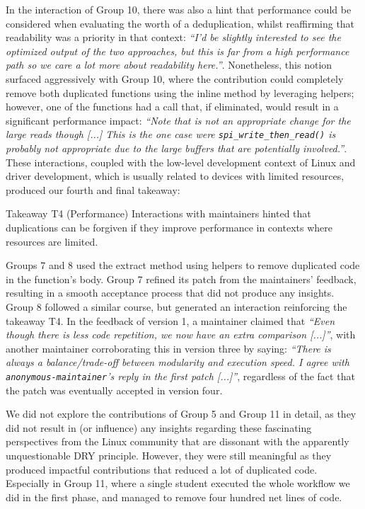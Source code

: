 \documentclass[10pt,conference]{IEEEtran}
\newenvironment{highlight-box}[1]{%
  \begin{tcolorbox}[colback=gray!10, colframe=gray!50!black, boxrule=0.5pt,
                    left=1mm, right=1mm, top=1mm, bottom=1mm, sharp corners]
  \textbf{#1:} \itshape}{\end{tcolorbox}}
\begin{document}
In the interaction of Group 10, there was also a hint that performance could be considered when evaluating the worth of a deduplication, whilst reaffirming that readability was a priority in that context: \textit{``I'd be slightly interested to see the optimized output of the two approaches, but this is far from a high performance path so we care a lot more about readability here.''}. Nonetheless, this notion surfaced aggressively with Group 10, where the contribution could completely remove both duplicated functions using the inline method by leveraging helpers; however, one of the functions had a call that, if eliminated, would result in a significant performance impact: \textit{``Note that is not an appropriate change for the large reads though [...] This is the one case were \texttt{spi\_write\_then\_read()} is probably not appropriate due to the large buffers that are potentially involved.''}. These interactions, coupled with the low-level development context of Linux and driver development, which is usually related to devices with limited resources, produced our fourth and final takeaway:

\begin{highlight-box}{Takeaway T4 (Performance)}
Interactions with maintainers hinted that duplications can be forgiven if they improve performance in contexts where resources are limited.
\end{highlight-box}

Groups 7 and 8 used the extract method using helpers to remove duplicated code in the function's body. Group 7 refined its patch from the maintainers' feedback, resulting in a smooth acceptance process that did not produce any insights. Group 8 followed a similar course, but generated an interaction reinforcing the takeaway T4. In the feedback of version 1, a maintainer claimed that \textit{``Even though there is less code repetition, we now have an extra comparison [...]''}, with another maintainer corroborating this in version three by saying: \textit{``There is always a balance/trade-off between modularity and execution speed. I agree with \texttt{anonymous-maintainer}'s reply in the first patch [...]''}, regardless of the fact that the patch was eventually accepted in version four.

We did not explore the contributions of Group 5 and Group 11 in detail, as they did not result in (or influence) any insights regarding these fascinating perspectives from the Linux community that are dissonant with the apparently unquestionable DRY principle. However, they were still meaningful as they produced impactful contributions that reduced a lot of duplicated code. Especially in Group 11, where a single student executed the whole workflow we did in the first phase, and managed to remove four hundred net lines of code.
\end{document}
